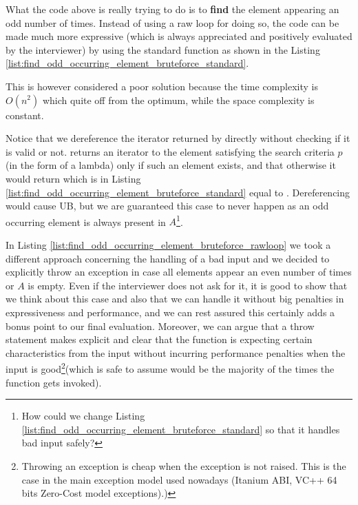 What the code above is really trying to do is to \textbf{find} the element appearing an odd number of times. Instead of using a raw loop for doing so, the code can be made much more expressive (which is always appreciated and positively evaluated by the interviewer) by using the standard  function as shown in the Listing \ref{list:find_odd_occurring_element_bruteforce_standard}.




This is however considered a poor solution because the time complexity is $O(n^2)$ which quite off from the optimum, while the space complexity is constant. 


Notice that we dereference the iterator returned by  directly without checking if it is valid or not. 
 returns an iterator to the element satisfying the search criteria $p$ (in the form of a lambda)  only if such an element exists, and that otherwise it would return  which is in Listing \ref{list:find_odd_occurring_element_bruteforce_standard} equal to . Dereferencing  would cause UB, but we are guaranteed this case to never happen as an odd occurring element is always present in $A$\footnote{How could we change Listing \ref{list:find_odd_occurring_element_bruteforce_standard} so that it handles bad input safely?}.

In Listing \ref{list:find_odd_occurring_element_bruteforce_rawloop} we took a different approach concerning the handling of a bad input and we decided to explicitly throw an exception in case all elements appear an even number of times or $A$ is empty. 
Even if the interviewer does not ask for it, it is good to show that we think about this case and also that we can handle it without big penalties in expressiveness and performance, and we can rest assured this certainly adds a bonus point to our final evaluation. 
Moreover, we can argue that a throw statement makes explicit and clear that the function is expecting certain characteristics from the input without incurring performance penalties when the input is good\footnote{Throwing an exception is cheap when the exception is not raised. This is the case in the main exception model used nowadays (Itanium ABI, VC++ 64 bits Zero-Cost model exceptions)\cite{cit:web:openstd_exception}.)}(which is safe to assume would be the majority of the times the function gets invoked).


